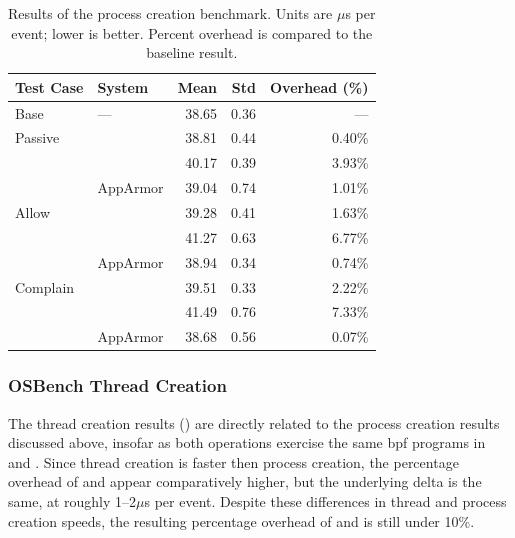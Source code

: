 \begingroup\small
\begin{longtable}[c]{llrrr}
  \caption[Results of the process creation benchmark]{
    Results of the process creation benchmark. Units are $\mu$s per event; lower is
    better. Percent overhead is compared to the baseline result.
  }%
  \label{tab:phoronix-processes}\\
  \toprule
   Test Case & System         &  Mean & Std & Overhead (\%)\\
   \midrule
   Base      & ---            & 38.65 & 0.36 &  ---    \\
   \midrule
   Passive   & \bpfbox{}      & 38.81 & 0.44 &  0.40\% \\
             & \bpfcontain{}  & 40.17 & 0.39 &  3.93\% \\
             & AppArmor       & 39.04 & 0.74 &  1.01\% \\
   \midrule
   Allow     & \bpfbox{}      & 39.28 & 0.41 &  1.63\% \\
             & \bpfcontain{}  & 41.27 & 0.63 &  6.77\% \\
             & AppArmor       & 38.94 & 0.34 &  0.74\% \\
   \midrule
   Complain  & \bpfbox{}      & 39.51 & 0.33 &  2.22\% \\
             & \bpfcontain{}  & 41.49 & 0.76 &  7.33\% \\
             & AppArmor       & 38.68 & 0.56 &  0.07\% \\
  \bottomrule
\end{longtable}
\endgroup

\subsubsection{OSBench Thread Creation}

The thread creation results () are directly related to the
process creation results discussed above, insofar as both operations exercise the same
\gls{bpf} programs in \bpfbox{} and \bpfcontain{}. Since thread creation is faster then
process creation, the percentage overhead of \bpfbox{} and \bpfcontain{} appear
comparatively higher, but the underlying delta is the same, at roughly 1--2$\mu$s per
event. Despite these differences in thread and process creation speeds, the resulting
percentage overhead of \bpfbox{} and \bpfcontain{} is still under 10\%.


